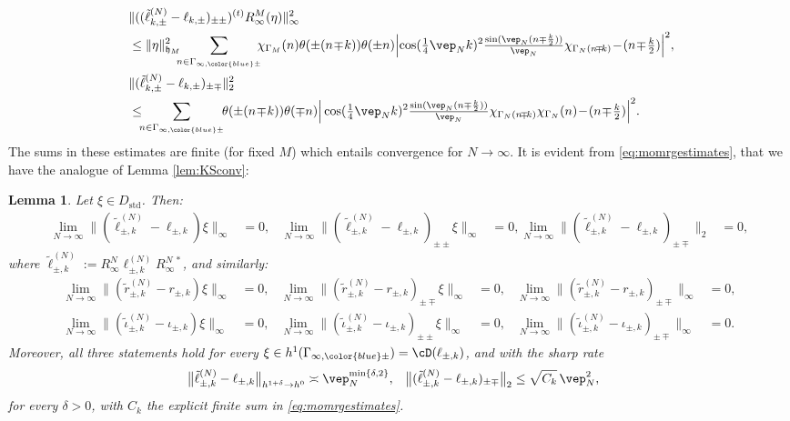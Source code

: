 \documentclass[a4paper, 11pt]{article}
\newcommand{\fh}{\mathfrak{h}}
\DeclareMathOperator{\1}{\mathds{1}}
\DeclareMathOperator{\std}{std}
\newtheorem{lemma}[thm]{Lemma}
\begin{document}
\begin{align}
\label{eq:momrgestimates}
& \|((\tilde{\ell}^{(N)}_{k,\pm}-\ell_{k,\pm})_{\pm\pm})^{(t)}R^{M}_{\infty}(\eta)\|_{\infty}^{2} \\ \nonumber
& \leq \|\eta\|_{\fh_{M}}^{2}\!\!\!\sum_{n\in\Gamma_{\infty,{\color{blue}\pm}}}\!\!\!\chi_{\Gamma_{M}}(n)\theta(\pm(n\!\mp\!k))\theta(\pm n)\Big|\!\cos(\tfrac{1}{4}\vep_{N}k)^{2}\tfrac{\sin(\vep_{N}(n\mp\frac{k}{2}))}{\vep_{N}}\chi_{\Gamma_{N}(n\!\mp\!k)}\!-\!(n\!\mp\!\tfrac{k}{2})\Big|^{2}, \\ \nonumber
& \|(\tilde{\ell}^{(N)}_{k,\pm}-\ell_{k,\pm})_{\pm\mp}\|_{2}^{2} \\ \nonumber
& \leq \!\!\!\sum_{n\in\Gamma_{\infty,{\color{blue}\pm}}}\!\!\theta(\pm(n\!\mp\!k))\theta(\mp n)\Big|\cos(\tfrac{1}{4}\vep_{N}k)^{2}\tfrac{\sin(\vep_{N}(n\mp\frac{k}{2}))}{\vep_{N}}\chi_{\Gamma_{N}(n\!\mp\!k)}\chi_{\Gamma_{N}}(n)\!-\!(n\!\mp\!\tfrac{k}{2})\Big|^{2}.
\end{align}
The sums in these estimates are finite (for fixed $M$) which entails convergence for $N\rightarrow\infty$. It is evident from \eqref{eq:momrgestimates}, that we have the analogue of Lemma \ref{lem:KSconv}:
\begin{lemma}
\label{lem:KSconvc}
Let $\xi\in D_{\std}$. Then:
\begin{align*}
\lim_{N\rightarrow\infty}\|(\tilde{\ell}^{(N)}_{\pm,k}\!-\!\ell_{\pm,k})\xi\|_{\infty} & = 0, & \lim_{N\rightarrow\infty}\|(\tilde{\ell}^{(N)}_{\pm,k}\!-\!\ell_{\pm,k})_{\pm\pm}\xi\|_{\infty} & = 0, \lim_{N\rightarrow\infty}\|(\tilde{\ell}^{(N)}_{\pm,k}\!-\!\ell_{\pm,k})_{\pm\mp}\|_{2} & = 0,
\end{align*}
where $\tilde{\ell}^{(N)}_{\pm,k}:=R^{N}_{\infty}\ell^{(N)}_{\pm,k}R^{N\!\ *}_{\infty}$, and similarly:
\begin{align*}
\lim_{N\rightarrow\infty}\|(\tilde{r}^{(N)}_{\pm,k}\!-\!r_{\pm,k})\xi\|_{\infty} & = 0, & \lim_{N\rightarrow\infty}\|(\tilde{r}^{(N)}_{\pm,k}\!-\!r_{\pm,k})_{\pm\mp}\xi\|_{\infty} & = 0, & \lim_{N\rightarrow\infty}\|(\tilde{r}^{(N)}_{\pm,k}\!-\!r_{\pm,k})_{\pm\mp}\|_{\infty} & = 0, \\
\lim_{N\rightarrow\infty}\|(\tilde{\iota}^{(N)}_{\pm,k}\!-\!\iota_{\pm,k})\xi\|_{\infty} & = 0, & \lim_{N\rightarrow\infty}\|(\tilde{\iota}^{(N)}_{\pm,k}\!-\!\iota_{\pm,k})_{\pm\pm}\xi\|_{\infty} & = 0, & \lim_{N\rightarrow\infty}\|(\tilde{\iota}^{(N)}_{\pm,k}\!-\!\iota_{\pm,k})_{\pm\mp}\|_{\infty} & = 0.
\end{align*} 
Moreover, all three statements hold for every $\xi\in h^{1}(\Gamma_{\infty,{\color{blue}\pm}}) = \cD(\ell_{\pm,k})$, and with the sharp rate
\begin{align}
\label{eq:momrgrate}
\big\|\tilde{\ell}^{(N)}_{\pm,k}-\ell_{\pm,k}\big\|_{h^{1+\delta}\rightarrow h^{0}} & \asymp \vep_{N}^{\min\{\delta,2\}}, & \big\|(\tilde{\ell}^{(N)}_{\pm,k}-\ell_{\pm,k})_{\pm\mp}\big\|_{2} & \leq \sqrt{C_{k}}\!\ \vep_{N}^{2},
\end{align}
for every $\delta>0$, with $C_{k}$ the explicit finite sum in \eqref{eq:momrgestimates}.
\end{lemma}
\end{document}

